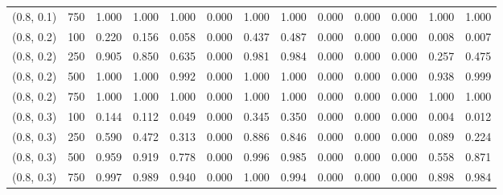 \begin{table}[ht]
{\begin{tabular}{ll|ccccccccccc}
			(0.8, 0.1) & 750 & 1.000 & 1.000 & 1.000 & 0.000 & 1.000 & 1.000 & 0.000 & 0.000 & 0.000 & 1.000 & 1.000 \\
			(0.8, 0.2) & 100 & 0.220 & 0.156 & 0.058 & 0.000 & 0.437 & 0.487 & 0.000 & 0.000 & 0.000 & 0.008 & 0.007 \\
			(0.8, 0.2) & 250 & 0.905 & 0.850 & 0.635 & 0.000 & 0.981 & 0.984 & 0.000 & 0.000 & 0.000 & 0.257 & 0.475 \\
			(0.8, 0.2) & 500 & 1.000 & 1.000 & 0.992 & 0.000 & 1.000 & 1.000 & 0.000 & 0.000 & 0.000 & 0.938 & 0.999 \\
			(0.8, 0.2) & 750 & 1.000 & 1.000 & 1.000 & 0.000 & 1.000 & 1.000 & 0.000 & 0.000 & 0.000 & 1.000 & 1.000 \\
			(0.8, 0.3) & 100 & 0.144 & 0.112 & 0.049 & 0.000 & 0.345 & 0.350 & 0.000 & 0.000 & 0.000 & 0.004 & 0.012 \\
			(0.8, 0.3) & 250 & 0.590 & 0.472 & 0.313 & 0.000 & 0.886 & 0.846 & 0.000 & 0.000 & 0.000 & 0.089 & 0.224 \\
			(0.8, 0.3) & 500 & 0.959 & 0.919 & 0.778 & 0.000 & 0.996 & 0.985 & 0.000 & 0.000 & 0.000 & 0.558 & 0.871 \\
			(0.8, 0.3) & 750 & 0.997 & 0.989 & 0.940 & 0.000 & 1.000 & 0.994 & 0.000 & 0.000 & 0.000 & 0.898 & 0.984 \\
			\hline
		\end{tabular}
		
	}
\end{table}


